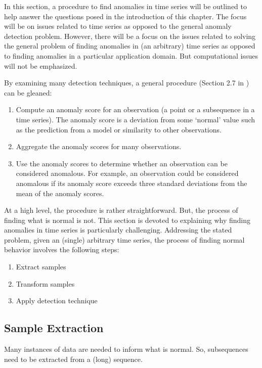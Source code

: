 In this section, a procedure to find anomalies in time series will be outlined to help answer the questions posed in the introduction of this chapter. The focus will be on issues related to time series as opposed to the general anomaly detection problem. However, there will be a focus on the issues related to solving the general problem of finding anomalies in (an arbitrary) time series as opposed to finding anomalies in a particular application domain. But computational issues will not be emphasized.

By examining many detection techniques, a general procedure (Section 2.7 in \cite{Cheboli2010}) can be gleaned:

\begin{enumerate}
\item Compute an anomaly score for an observation (a point or a subsequence in a time series). The anomaly score is a deviation from some `normal' value such as the prediction from a model or similarity to other observations.
\item Aggregate the anomaly scores for many observations.
\item Use the anomaly scores to determine whether an observation can be considered anomalous. For example, an observation could be considered anomalous if its anomaly score exceeds three standard deviations from the mean of the anomaly scores.
\end{enumerate}

At a high level, the procedure is rather straightforward. But, the process of finding what is normal is not. This section is devoted to explaining why finding anomalies in time series is particularly challenging. Addressing the stated problem, given an (single) arbitrary time series, the process of finding normal behavior involves the following steps:
\begin{enumerate}
\item Extract samples
\item Transform samples
\item Apply detection technique
\end{enumerate}

\subsection{Sample Extraction}
\label{sec:adsample}

Many instances of data are needed to inform what is normal. So, subsequences need to be extracted from a (long) sequence.

